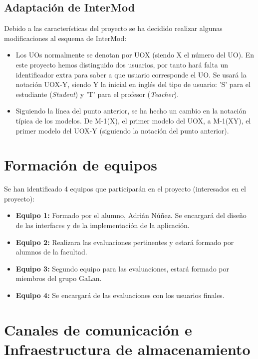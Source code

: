 \subsection{Adaptación de InterMod}
\label{adaptacion-intermod}

Debido a las características del proyecto se ha decidido realizar algunas modificaciones al esquema de InterMod:

\begin{itemize}
\item Los UOs normalmente se denotan por UOX (siendo X el número del UO). En este proyecto hemos distinguido dos usuarios, por tanto hará falta un identificador extra para saber a que usuario corresponde el UO. Se usará la notación UOX-Y, siendo Y la inicial en inglés del tipo de usuario: 'S' para el estudiante (\textit{Student}) y 'T' para el profesor (\textit{Teacher}).
\item Siguiendo la línea del punto anterior, se ha hecho un cambio en la notación típica de los modelos. De M-1(X), el primer modelo del UOX, a M-1(XY), el primer modelo del UOX-Y (siguiendo la notación del punto anterior).
\end{itemize}

\section{Formación de equipos}
\label{equipos}

Se han identificado 4 equipos que participarán en el proyecto (interesados en el proyecto):

\begin{itemize}
\item \textbf{Equipo 1:} Formado por el alumno, Adrián Núñez. Se encargará del diseño de las interfaces y de la implementación de la aplicación.
\item \textbf{Equipo 2:} Realizara las evaluaciones pertinentes y estará formado por alumnos de la facultad.
\item \textbf{Equipo 3:} Segundo equipo para las evaluaciones, estará formado por miembros del grupo GaLan.
\item \textbf{Equipo 4:} Se encargará de las evaluaciones con los usuarios finales.
\end{itemize}

\section{Canales de comunicación e Infraestructura de almacenamiento}

